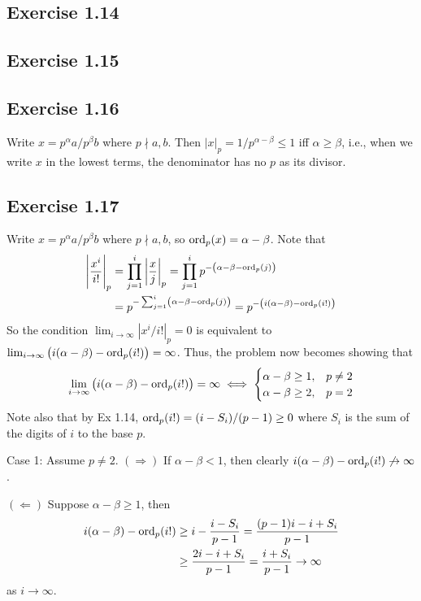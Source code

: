 \documentclass[../Koblitz.tex]{subfiles}
\begin{document}
\subsection*{Exercise 1.14}

\subsection*{Exercise 1.15}

\subsection*{Exercise 1.16}

Write $x=p^\alpha a/p^\beta b$ where $p\nmid a,b$. Then $|x|_p=1/p^{\alpha-\beta}\leq1$ iff $\alpha\geq\beta$, i.e., when we write $x$ in the lowest terms, the denominator has no $p$ as its divisor.

\subsection*{Exercise 1.17}

Write $x=p^\alpha a/p^\beta b$ where $p\nmid a,b$, so $\operatorname{ord}_p(x)=\alpha-\beta$. Note that
\begin{align*}
\left|\frac{x^i}{i!}\right|_p &= \prod_{j=1}^i \left|\frac{x}{j}\right|_p = \prod_{j=1}^i p^{-\left(\alpha-\beta-\operatorname{ord}_p(j)\right)} \\
&= p^{-\sum_{j=1}^i \left(\alpha-\beta-\operatorname{ord}_p(j)\right)} = p^{-\left(i(\alpha-\beta)-\operatorname{ord}_p(i!)\right)}
\end{align*}
So the condition $\lim_{i\to\infty} |x^i/i!|_p=0$ is equivalent to $\lim_{i\to\infty} \left(i(\alpha-\beta)-\operatorname{ord}_p(i!)\right)=\infty$. Thus, the problem now becomes showing that
\begin{align*}
\lim_{i\to\infty} \left(i(\alpha-\beta)-\operatorname{ord}_p(i!)\right)=\infty \iff
\begin{cases}
\alpha-\beta\geq 1, &p\neq2 \\
\alpha-\beta\geq 2, &p=2
\end{cases}
\end{align*}
Note also that by Ex 1.14, $\operatorname{ord}_p(i!)=(i-S_i)/(p-1)\geq0$ where $S_i$ is the sum of the digits of $i$ to the base $p$.

Case 1: Assume $p\neq2$. $(\Rightarrow)$ If $\alpha-\beta<1$, then clearly $i(\alpha-\beta)-\operatorname{ord}_p(i!)\not\to\infty$.

$(\Leftarrow)$ Suppose $\alpha-\beta\geq 1$, then
\begin{align*}
i(\alpha-\beta)-\operatorname{ord}_p(i!) &\geq i-\frac{i-S_i}{p-1} = \frac{(p-1)i-i+S_i}{p-1} \\
&\geq \frac{2i-i+S_i}{p-1} = \frac{i+S_i}{p-1} \to \infty
\end{align*}
as $i\to\infty$.
\end{document}
